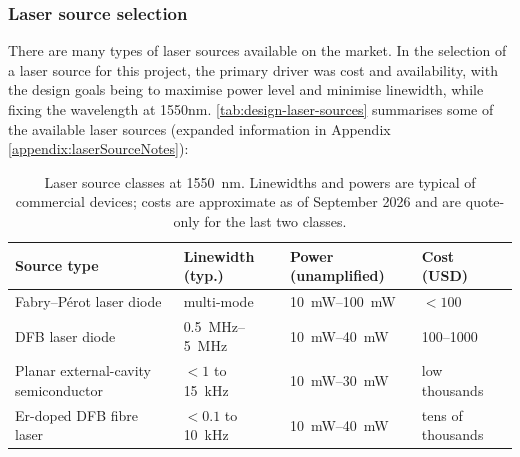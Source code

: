     

    \subsubsection{Laser source selection}
    There are many types of laser sources available on the market. In the selection of a laser source for this project, the primary driver was cost and availability, with the design goals being to maximise power level and minimise linewidth, while fixing the wavelength at 1550nm. \autoref{tab:design-laser-sources} summarises some of the available laser sources (expanded information in Appendix \ref{appendix:laserSourceNotes}):

\begin{table}[H]
	\centering\small
	\renewcommand{\arraystretch}{1.15}
	\setlength{\tabcolsep}{5pt}
	\begin{tabular}{|p{5cm}|p{3cm}|p{3.5cm}|p{3cm}|}
		\hline
		\textbf{Source type} & \textbf{Linewidth (typ.)} & \textbf{Power (unamplified)} & \textbf{Cost (USD)} \\
		\hline
		Fabry--P\'erot laser diode           & multi-mode                      & \SIrange{10}{100}{\milli\watt} & $<100$ \\ \hline
		DFB laser diode                      & \SIrange{0.5}{5}{\mega\hertz}   & \SIrange{10}{40}{\milli\watt}  & \numrange{100}{1000} \\ \hline
		Planar external-cavity semiconductor & $<1$ to \SI{15}{\kilo\hertz}    & \SIrange{10}{30}{\milli\watt}  & low thousands \\ \hline
		Er-doped DFB fibre laser             & $<0.1$ to \SI{10}{\kilo\hertz}  & \SIrange{10}{40}{\milli\watt}  & tens of thousands \\ \hline
	
	\end{tabular}
	\caption{Laser source classes at \SI{1550}{\nano\metre}. Linewidths and powers are typical of commercial devices; costs are approximate as of September 2026 and are quote-only for the last two classes.}
	\label{tab:design-laser-sources}
\end{table}

